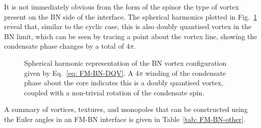 It is not immediately obvious from the form of the spinor the type of vortex
present on the BN side of the interface.
The spherical harmonics plotted in Fig.~\ref{fig: BN-DQV} reveal that, similar
to the cyclic case, this is also doubly quantised vortex in the BN limit, which
can be seen by tracing a point about the vortex line, showing the condensate
phase changes by a total of \(4\pi \).
\begin{figure}
    \centering
    \caption[Spherical harmonic representation of a biaxial nematic doubly
        quantised vortex]
    {\label{fig: BN-DQV} Spherical harmonic
        representation of the BN vortex configuration given by
        Eq.~\eqref{eq: FM-BN-DQV}.
        A \(4\pi \) winding of the condensate phase about the core indicates
        this is a doubly quantised vortex, coupled with a non-trivial rotation
        of the condensate spin.}
\end{figure}
A summary of vortices, textures, and monopoles that can be constructed using
the Euler angles in an FM-BN interface is given in Table~\ref{tab: FM-BN-other}.
